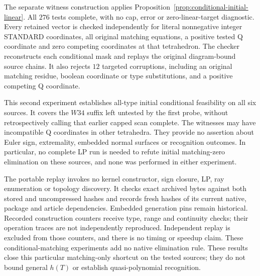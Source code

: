 The separate witness construction applies
Proposition~\ref{prop:conditional-initial-linear}.  All $276$ tests
complete, with no cap, error or zero-linear-target diagnostic.  Every
retained vector is checked independently for literal nonnegative
integer STANDARD coordinates, all original matching equations, a
positive tested Q coordinate and zero competing coordinates at that
tetrahedron.  The checker reconstructs each conditional mask and
replays the original diagram-bound source chains.  It also rejects
$12$ targeted corruptions, including an original matching residue,
boolean coordinate or type substitutions, and a positive competing
Q coordinate.

This second experiment establishes all-type initial conditional
feasibility on all six sources.  It covers the $W34$ suffix left
untested by the first probe, without retrospectively calling that
earlier capped scan complete.  The witnesses may have incompatible
Q coordinates in other tetrahedra.  They provide no assertion about
Euler sign, extremality, embedded normal surfaces or recognition
outcomes.  In particular, no complete LP run is needed to refute
initial matching-zero elimination on these sources, and none was
performed in either experiment.

The portable replay invokes no kernel constructor, sign closure, LP,
ray enumeration or topology discovery.  It checks exact archived
bytes against both stored and uncompressed hashes and records fresh
hashes of its current native, package and article dependencies.
Embedded generation pins remain historical.  Recorded construction
counters receive type, range and continuity checks; their operation
traces are not independently reproduced.  Independent replay is
excluded from those counters, and there is no timing or speedup claim.
These conditional-matching experiments add no native elimination rule.
These results close this
particular matching-only shortcut on the tested sources; they do not
bound general $h(T)$ or establish quasi-polynomial recognition.
